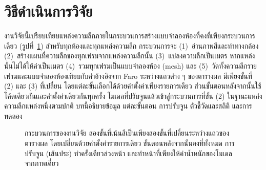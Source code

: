 \section{วิธีดำเนินการวิจัย}\label{sec:method}

งานวิจัยนี้เปรียบเทียบแหล่งความลึกภายในกระบวนการสร้างแบบจำลองห้องที่คงที่เพียงกระบวนการเดียว
(รูปที่~\ref{fig:pipeline}) สำหรับทุกห้องและทุกแหล่งความลึก กระบวนการจะ (1)~อ่านภาพสีและท่าทางกล้อง
(2)~สร้างแผนที่ความลึกของทุกเฟรมจากแหล่งความลึกนั้น (3)~แปลงความลึกเป็นเมตร หากแหล่งนั้นไม่ได้ให้ค่าเป็นเมตร
(4)~รวมทุกเฟรมเป็นแบบจำลองห้อง (mesh) และ (5)~วัดทั้งความลึกรายเฟรมและแบบจำลองห้องเทียบกับค่าอ้างอิงจาก Faro
ระหว่างแถวต่าง ๆ ของตารางผล มีเพียงขั้นที่ (2) และ (3) ที่เปลี่ยน โดยแต่ละขั้นเลือกได้ด้วยค่าตั้งค่าเพียงรายการเดียว
ส่วนขั้นตอนหลังจากนั้นใช้โค้ดเดียวกันและค่าตั้งค่าเดียวกันทุกครั้ง โมเดลที่ปรับจูนแล้วเข้าสู่กระบวนการที่ขั้น (2)
ในฐานะแหล่งความลึกแหล่งหนึ่งตามปกติ บทนี้อธิบายข้อมูล แต่ละขั้นตอน การปรับจูน ตัวชี้วัดและสถิติ และการทดลอง

\begin{figure}[t]
\centering
{}
\caption{กระบวนการของงานวิจัย สองขั้นที่เน้นสีเป็นเพียงสองขั้นที่เปลี่ยนระหว่างแถวของตารางผล
โดยเปลี่ยนด้วยค่าตั้งค่ารายการเดียว ขั้นตอนหลังจากนั้นคงที่ทั้งหมด การปรับจูน (เส้นประ) ทำครั้งเดียวล่วงหน้า
และทำหน้าที่เพียงให้ค่าน้ำหนักของโมเดลจากภาพเดี่ยว}
\label{fig:pipeline}
\end{figure}

